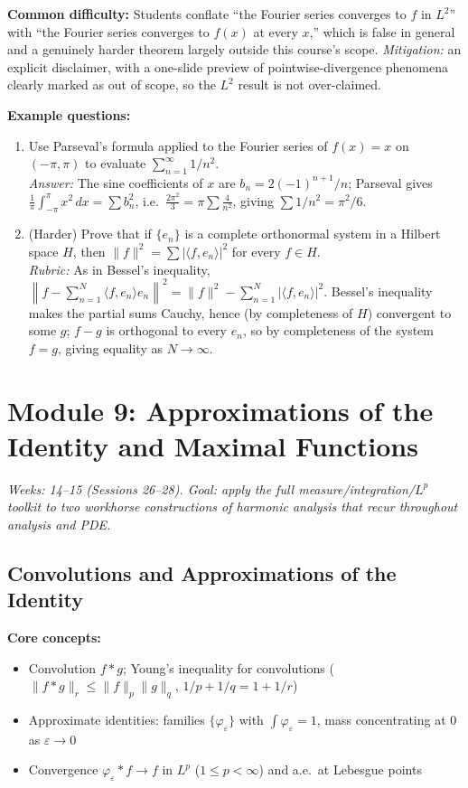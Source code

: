 \documentclass[11pt]{article}
\begin{document}
\textbf{Common difficulty:} Students conflate ``the Fourier series converges to $f$ in $L^2$'' with ``the Fourier series converges to $f(x)$ at every $x$,'' which is false in general and a genuinely harder theorem largely outside this course's scope. \textit{Mitigation:} an explicit disclaimer, with a one-slide preview of pointwise-divergence phenomena clearly marked as out of scope, so the $L^2$ result is not over-claimed.

\textbf{Example questions:}
\begin{enumerate}[nosep]
\item Use Parseval's formula applied to the Fourier series of $f(x)=x$ on $(-\pi,\pi)$ to evaluate $\sum_{n=1}^\infty 1/n^2$. \\
\textit{Answer:} The sine coefficients of $x$ are $b_n=2(-1)^{n+1}/n$; Parseval gives $\frac{1}{\pi}\int_{-\pi}^\pi x^2\,dx=\sum b_n^2$, i.e.\ $\frac{2\pi^2}{3}=\pi\sum\frac{4}{n^2}$, giving $\sum 1/n^2=\pi^2/6$.
\item (Harder) Prove that if $\{e_n\}$ is a complete orthonormal system in a Hilbert space $H$, then $\|f\|^2=\sum|\langle f,e_n\rangle|^2$ for every $f\in H$. \\
\textit{Rubric:} As in Bessel's inequality, $\left\|f-\sum_{n=1}^N\langle f,e_n\rangle e_n\right\|^2=\|f\|^2-\sum_{n=1}^N|\langle f,e_n\rangle|^2$. Bessel's inequality makes the partial sums Cauchy, hence (by completeness of $H$) convergent to some $g$; $f-g$ is orthogonal to every $e_n$, so by completeness of the system $f=g$, giving equality as $N\to\infty$.
\end{enumerate}

\section{Module 9: Approximations of the Identity and Maximal Functions}
\textit{Weeks: 14--15 (Sessions 26--28). Goal: apply the full measure/integration/$L^p$ toolkit to two workhorse constructions of harmonic analysis that recur throughout analysis and PDE.}

\subsection{Convolutions and Approximations of the Identity}

\textbf{Core concepts:}
\begin{itemize}[nosep]
\item Convolution $f*g$; Young's inequality for convolutions ($\|f*g\|_r\le\|f\|_p\|g\|_q$, $1/p+1/q=1+1/r$)
\item Approximate identities: families $\{\varphi_\varepsilon\}$ with $\int\varphi_\varepsilon=1$, mass concentrating at $0$ as $\varepsilon\to0$
\item Convergence $\varphi_\varepsilon*f\to f$ in $L^p$ ($1\le p<\infty$) and a.e.\ at Lebesgue points
\end{itemize}
\end{document}
